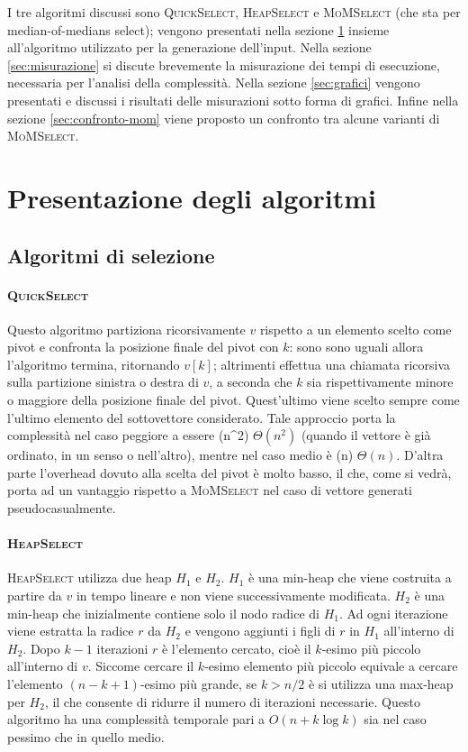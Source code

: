 \documentclass[a4paper]{article}
\newcommand{\QuickSelect}{\textsc{QuickSelect}}
\newcommand{\HeapSelect}{\textsc{HeapSelect}}
\newcommand{\MoMSelect}{\textsc{MoMSelect}}
\newcommand{\Tquad}{\ifmmode \Theta(n^2) \else $\Theta(n^2)$\fi} %
\newcommand{\Tlin}{\ifmmode \Theta(n) \else $\Theta(n)$\fi} %
\begin{document}
I tre algoritmi discussi sono \QuickSelect{}, \HeapSelect{} e \MoMSelect{} (che sta per median-of-medians select); vengono presentati nella sezione \ref{sec:presentazione-algoritmi} insieme all'algoritmo utilizzato per la generazione dell'input.
Nella sezione \ref{sec:misurazione} si discute brevemente la misurazione dei tempi di esecuzione, necessaria per l'analisi della complessità.
Nella sezione \ref{sec:grafici} vengono presentati e discussi i risultati delle misurazioni sotto forma di grafici.
Infine nella sezione \ref{sec:confronto-mom} viene proposto un confronto tra alcune varianti di \MoMSelect{}.



\section{Presentazione degli algoritmi}
\label{sec:presentazione-algoritmi}

\subsection{Algoritmi di selezione}
\paragraph{\QuickSelect}
Questo algoritmo partiziona ricorsivamente $v$ rispetto a un elemento scelto come pivot e confronta la posizione finale del pivot con $k$: sono sono uguali allora l'algoritmo termina, ritornando $v[k]$; altrimenti effettua una chiamata ricorsiva sulla partizione sinistra o destra di $v$, a seconda che $k$ sia rispettivamente minore o maggiore della posizione finale del pivot.
Quest'ultimo viene scelto sempre come l'ultimo elemento del sottovettore considerato.
Tale approccio porta la complessità nel caso peggiore a essere \Tquad{} (quando il vettore è già ordinato, in un senso o nell'altro), mentre nel caso medio è \Tlin.
D'altra parte l'overhead dovuto alla scelta del pivot è molto basso, il che, come si vedrà, porta ad un vantaggio rispetto a \MoMSelect{} nel caso di vettore generati pseudocasualmente.

\paragraph{\HeapSelect}
\HeapSelect{} utilizza due heap $H_1$ e $H_2$.
$H_1$ è una min-heap che viene costruita a partire da $v$ in tempo lineare e non viene successivamente modificata.
$H_2$ è una min-heap che inizialmente contiene solo il nodo radice di $H_1$.
Ad ogni iterazione viene estratta la radice $r$ da $H_2$ e vengono aggiunti i figli di $r$ in $H_1$ all'interno di $H_2$.
Dopo $k-1$ iterazioni $r$ è l'elemento cercato, cioè il $k$-esimo più piccolo all'interno di $v$.
Siccome cercare il $k$-esimo elemento più piccolo equivale a cercare l'elemento $(n-k+1)$-esimo più grande, se $k>n/2$ è si utilizza una max-heap per $H_2$, il che consente di ridurre il numero di iterazioni necessarie.
Questo algoritmo ha una complessità temporale pari a $O(n+k\log k)$ sia nel caso pessimo che in quello medio.
\end{document}
